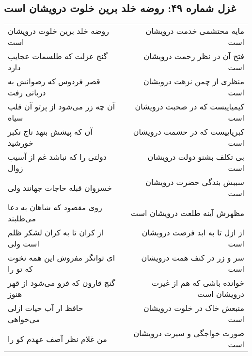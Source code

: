 \begin{center}
\section*{غزل شماره ۴۹: روضه خلد برین خلوت درویشان است}
\label{sec:sh049}
\begin{longtable}{l p{0.5cm} r}
روضه خلد برین خلوت درویشان است
&&
مایه محتشمی خدمت درویشان است
\\
گنج عزلت که طلسمات عجایب دارد
&&
فتح آن در نظر رحمت درویشان است
\\
قصر فردوس که رضوانش به دربانی رفت
&&
منظری از چمن نزهت درویشان است
\\
آن چه زر می‌شود از پرتو آن قلب سیاه
&&
کیمیاییست که در صحبت درویشان است
\\
آن که پیشش بنهد تاج تکبر خورشید
&&
کبریاییست که در حشمت درویشان است
\\
دولتی را که نباشد غم از آسیب زوال
&&
بی تکلف بشنو دولت درویشان است
\\
خسروان قبله حاجات جهانند ولی
&&
سببش بندگی حضرت درویشان است
\\
روی مقصود که شاهان به دعا می‌طلبند
&&
مظهرش آینه طلعت درویشان است
\\
از کران تا به کران لشکر ظلم است ولی
&&
از ازل تا به ابد فرصت درویشان است
\\
ای توانگر مفروش این همه نخوت که تو را
&&
سر و زر در کنف همت درویشان است
\\
گنج قارون که فرو می‌شود از قهر هنوز
&&
خوانده باشی که هم از غیرت درویشان است
\\
حافظ ار آب حیات ازلی می‌خواهی
&&
منبعش خاک در خلوت درویشان است
\\
من غلام نظر آصف عهدم کو را
&&
صورت خواجگی و سیرت درویشان است
\\
\end{longtable}
\end{center}
